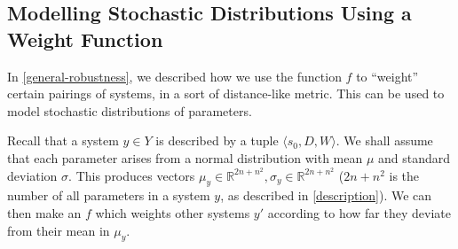 \documentclass{article}
\begin{document}
\subsection{Modelling Stochastic Distributions Using a Weight Function}
In \ref{general-robustness}, we described how we use the function $f$ to ``weight'' certain pairings of systems, in a sort of distance-like metric. This can be used to model stochastic distributions of parameters.

Recall that a system $y \in Y$ is described by a tuple $\langle s_0, D, W \rangle$. We shall assume that each parameter arises from a normal distribution with mean $\mu$ and standard deviation $\sigma$. This produces vectors $\mu_y \in \mathbb{R}^{2n + n^2}, \sigma_y \in \mathbb{R}^{2n + n^2}$ ($2n + n^2$ is the number of all parameters in a system $y$, as described in \ref{description}). We can then make an $f$ which weights other systems $y'$ according to how far they deviate from their mean in $\mu_y$.
\end{document}

